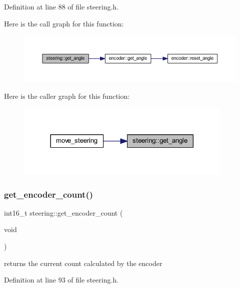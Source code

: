 Definition at line 88 of file steering.\+h.

Here is the call graph for this function\+:
\nopagebreak
\begin{figure}[H]
\begin{center}
\leavevmode
\includegraphics[width=350pt]{classsteering_aa2e30069b2a7d5ec7c4d8eeb0e30da32_cgraph}
\end{center}
\end{figure}
Here is the caller graph for this function\+:
\nopagebreak
\begin{figure}[H]
\begin{center}
\leavevmode
\includegraphics[width=294pt]{classsteering_aa2e30069b2a7d5ec7c4d8eeb0e30da32_icgraph}
\end{center}
\end{figure}
\mbox{\label{classsteering_ae32b701e46af6861f02b59aeb64beb0c}} 
\subsubsection{\texorpdfstring{get\_encoder\_count()}{get\_encoder\_count()}}
{\footnotesize\ttfamily int16\+\_\+t steering\+::get\+\_\+encoder\+\_\+count (\begin{DoxyParamCaption}\item[{void}]{ }\end{DoxyParamCaption})\hspace{0.3cm}{\ttfamily [inline]}}



returns the current count calculated by the encoder 



Definition at line 93 of file steering.\+h.

